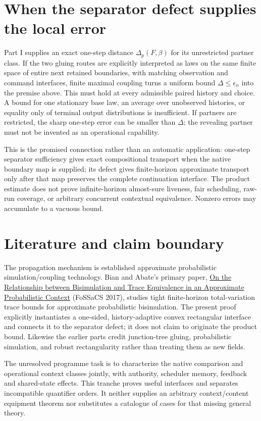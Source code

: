 \documentclass[11pt]{article}
\begin{document}
\section{When the separator defect supplies the local error}
Part I supplies an exact one-step distance $\Delta_p(F,\beta)$ for its unrestricted partner class. If the two gluing routes are explicitly interpreted as laws on the same finite space of entire next retained boundaries, with matching observation and command interfaces, finite maximal coupling turns a uniform bound $\Delta\le\epsilon_n$ into the premise above. This must hold at every admissible paired history and choice. A bound for one stationary base law, an average over unobserved histories, or equality only of terminal output distributions is insufficient. If partners are restricted, the sharp one-step error can be smaller than $\Delta$; the revealing partner must not be invented as an operational capability.

This is the promised connection rather than an automatic application: one-step separator sufficiency gives exact compositional transport when the native boundary map is supplied; its defect gives finite-horizon approximate transport only after that map preserves the complete continuation interface. The product estimate does not prove infinite-horizon almost-sure liveness, fair scheduling, raw-run coverage, or arbitrary concurrent contextual equivalence. Nonzero errors may accumulate to a vacuous bound.

\section{Literature and claim boundary}
The propagation mechanism is established approximate probabilistic simulation/coupling technology. Bian and Abate's primary paper,
\href{https://www.cs.ox.ac.uk/people/alessandro.abate/publications/bcBA17.pdf}{On the Relationship between Bisimulation and Trace Equivalence in an Approximate Probabilistic Context} (FoSSaCS 2017), studies tight finite-horizon total-variation trace bounds for approximate probabilistic bisimulation. The present proof explicitly instantiates a one-sided, history-adaptive convex rectangular interface and connects it to the separator defect; it does not claim to originate the product bound. Likewise the earlier parts credit junction-tree gluing, probabilistic simulation, and robust rectangularity rather than treating them as new fields.

The unresolved programme task is to characterize the native comparison and operational context classes jointly, with authority, scheduler memory, feedback and shared-state effects. This tranche proves useful interfaces and separates incompatible quantifier orders. It neither supplies an arbitrary context/content equipment theorem nor substitutes a catalogue of cases for that missing general theory.
\end{document}
